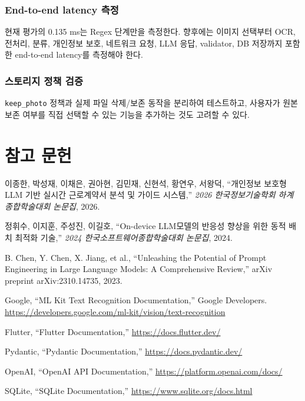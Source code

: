 \documentclass[11pt,a4paper]{article}
\begin{document}
\subsubsection{End-to-end latency 측정}

현재 평가의 0.135 ms는 Regex 단계만을 측정한다. 향후에는 이미지 선택부터 OCR, 전처리, 분류, 개인정보 보호, 네트워크 요청, LLM 응답, validator, DB 저장까지 포함한 end-to-end latency를 측정해야 한다.

\subsubsection{스토리지 정책 검증}

\texttt{keep\_photo} 정책과 실제 파일 삭제/보존 동작을 분리하여 테스트하고, 사용자가 원본 보존 여부를 직접 선택할 수 있는 기능을 추가하는 것도 고려할 수 있다.

\newpage

\section{참고 문헌}

\begin{enumerate}[label={[\arabic*]}]
    \item 이종한, 박성재, 이채은, 권아현, 김민재, 신현석, 황연우, 서왕덕,
    ``개인정보 보호형 LLM 기반 실시간 근로계약서 분석 및 가이드 시스템,''
    \textit{2026 한국정보기술학회 하계 종합학술대회 논문집}, 2026.

    \item 정휘수, 이지훈, 주성진, 이길호,
    ``On-device LLM모델의 반응성 향상을 위한 동적 배치 최적화 기술,''
    \textit{2024 한국소프트웨어종합학술대회 논문집}, 2024.

    \item B. Chen, Y. Chen, X. Jiang, et al.,
    ``Unleashing the Potential of Prompt Engineering in Large Language Models: A Comprehensive Review,''
    arXiv preprint arXiv:2310.14735, 2023.

    \item Google,
    ``ML Kit Text Recognition Documentation,''
    Google Developers.
    \url{https://developers.google.com/ml-kit/vision/text-recognition}

    \item Flutter,
    ``Flutter Documentation,''
    \url{https://docs.flutter.dev/}

    \item Pydantic,
    ``Pydantic Documentation,''
    \url{https://docs.pydantic.dev/}

    \item OpenAI,
    ``OpenAI API Documentation,''
    \url{https://platform.openai.com/docs/}

    \item SQLite,
    ``SQLite Documentation,''
    \url{https://www.sqlite.org/docs.html}
\end{enumerate}
\end{document}
